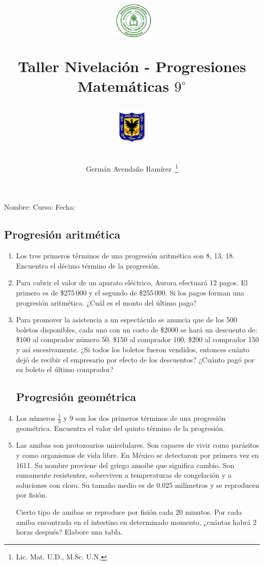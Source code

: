 \documentclass[twoside,letterpaper]{article}
\author{Germ\'an Avenda\~no Ram\'irez~\thanks{Lic. Mat. U.D., M.Sc. U.N.}}
\title{\begin{minipage}{.2\textwidth}
\includegraphics[height=1.75cm]{Images/logo-colegio.png}\end{minipage}
\begin{minipage}{.55\textwidth}
\begin{center}
Taller Nivelación - Progresiones\\
Matemáticas $9^{\circ}$
\end{center}
\end{minipage}\hfill
\begin{minipage}{.2\textwidth}
\includegraphics[height=1.75cm]{Images/logo-sed.png} 
\end{minipage}}
\date{}
\begin{document}
\maketitle
Nombre: \hrulefill Curso: \underline{\hspace*{44pt}} Fecha: \underline{\hspace*{2.5cm}}
\begin{multicols}{2}
\section*{Progresión aritmética}
\begin{enumerate}
\item Los tres primeros términos de una progresión aritmética son 8, 13, 18. Encuentra el décimo término de la progresión.
\item Para cubrir el valor de un aparato eléctrico, Aurora efectuará 12 pagos. El primero es de \$275\,000 y el segundo de \$255\,000. Si los pagos forman una progresión aritmética. ¿Cuál es el monto del último pago?
\item Para promover la asistencia a un espectáculo se anuncia que de los 500 boletos disponibles, cada uno con un costo de \$2000 se hará un descuento de: \$100 al comprador número 50, \$150 al comprador 100, \$200 al comprador 150 y así sucesivamente. ¿Si todos los boletos fueron vendidos, entonces cuánto dejó de recibir el empresario por efecto de los descuentos? ¿Cuánto pagó por su boleto el último comprador?
\section*{Progresión geométrica}
\item Los números $\frac{1}{3}$ y 9 son los dos primeros términos de una progresión geométrica. Encuentra el valor del quinto término de la progresión.
\item Las amibas son protozoarios unicelulares. Son capaces de vivir como parásitos y como organismos de vida libre. En México se detectaron por primera vez en 1611. Su nombre proviene del griego amoibe que significa cambio. Son sumamente resistentes, sobreviven a temperaturas de congelación y a soluciones con cloro. Su tamaño medio es de 0.025 milímetros y se reproducen por fisión.

Cierto tipo de amibas se reproduce por fisión cada 20 minutos. Por cada amiba encontrada en el intestino en determinado momento, ¿cuántas habrá 2 horas después? Elabore una tabla.
\end{enumerate}
\end{multicols}
\end{document}
